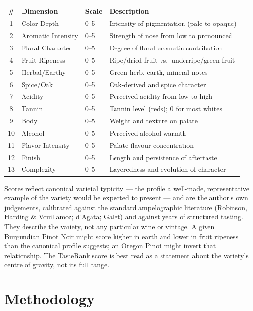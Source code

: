 \documentclass[11pt]{article}
\begin{document}
\begin{center}
\begin{tabular}{@{}clll@{}}
\toprule
\# & Dimension & Scale & Description \\
\midrule
1  & Color Depth         & 0--5 & Intensity of pigmentation (pale to opaque) \\
2  & Aromatic Intensity  & 0--5 & Strength of nose from low to pronounced \\
3  & Floral Character    & 0--5 & Degree of floral aromatic contribution \\
4  & Fruit Ripeness      & 0--5 & Ripe/dried fruit vs.\ underripe/green fruit \\
5  & Herbal/Earthy       & 0--5 & Green herb, earth, mineral notes \\
6  & Spice/Oak           & 0--5 & Oak-derived and spice character \\
7  & Acidity             & 0--5 & Perceived acidity from low to high \\
8  & Tannin              & 0--5 & Tannin level (reds); 0 for most whites \\
9  & Body                & 0--5 & Weight and texture on palate \\
10 & Alcohol             & 0--5 & Perceived alcohol warmth \\
11 & Flavor Intensity    & 0--5 & Palate flavour concentration \\
12 & Finish              & 0--5 & Length and persistence of aftertaste \\
13 & Complexity          & 0--5 & Layeredness and evolution of character \\
\bottomrule
\end{tabular}
\end{center}

Scores reflect canonical varietal typicity --- the profile a well-made, representative example of the variety would be expected to present --- and are the author's own judgements, calibrated against the standard ampelographic literature (Robinson, Harding \& Vouillamoz; d'Agata; Galet) and against years of structured tasting. They describe the variety, not any particular wine or vintage. A given Burgundian Pinot Noir might score higher in earth and lower in fruit ripeness than the canonical profile suggests; an Oregon Pinot might invert that relationship. The TasteRank score is best read as a statement about the variety's centre of gravity, not its full range.

\section{Methodology}
\end{document}
